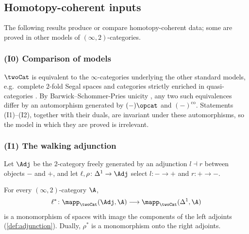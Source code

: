 \subsection{Homotopy-coherent inputs}
\label{subsec:prelim-inputs}

The following results produce or compare homotopy-coherent data; some are proved in other models of $(\infty,2)$-categories.

\subsubsection*{(I0) Comparison of models}
$\twoCat$ is equivalent to the $\infty$-categories underlying the other standard models, e.g.\ complete $2$-fold Segal spaces \cite{gepnerhaugseng2015enriched} and categories strictly enriched in quasi-categories \cite{haugseng2015rectification}. By Barwick--Schommer-Pries unicity \cite{barwickschommerpries2021unicity}, any two such equivalences differ by an automorphism generated by $(-)\opcat$ and $(-)^{\mathrm{co}}$.
Statements (I1)--(I2), together with their duals, are invariant under these automorphisms, so the model in which they are proved is irrelevant.

\subsubsection*{(I1) The walking adjunction}
Let $\Adj$ be the $2$-category freely generated by an adjunction $l \dashv r$ between objects $-$ and $+$, and let $\ell,\rho\colon \Delta^{1} \to \Adj$ select $l\colon - \to +$ and $r\colon + \to -$.

\begin{thm}
\label{thm:walking-adjunction}
For every $(\infty,2)$-category $\A$,
\[
\ell^{*}\colon \mapp_{\twoCat}(\Adj,\A) \longrightarrow \mapp_{\twoCat}(\Delta^{1},\A)
\]
is a monomorphism of spaces with image the components of the left adjoints (\cref{def:adjunction}). Dually, $\rho^{*}$ is a monomorphism onto the right adjoints.
\end{thm}

